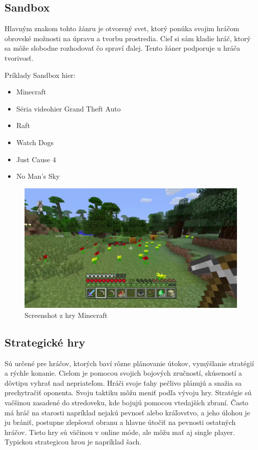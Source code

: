 \documentclass[10pt,twoside,slovak,a4paper]{article}
\begin{document}
\subsection{Sandbox} \label{zanre:sanbox}

Hlavným znakom tohto žánru je otvorený svet, ktorý ponúka svojim hráčom obrovské možnosti na úpravu a tvorbu prostredia. Cieľ si sám kladie hráč, ktorý sa môže slobodne rozhodovať čo spraví ďalej. Tento žáner podporuje u hráča tvorivosť. 

Príklady Sandbox hier:
\begin{itemize}
\item Minecraft
\item Séria videohier Grand Theft Auto
\item Raft
\item Watch Dogs
\item Just Cause 4
\item No Man's Sky
\end{itemize}

\begin{figure}[tbh]
\centering
\includegraphics[scale=0.15]{minecraft.jpg}
\caption{Screenshot z hry Minecraft}
\label{f:minecraft}
\end{figure}

\subsection{Strategické hry} \label{zanre:strategicke}

Sú určené pre hráčov, ktorých baví rôzne plánovanie útokov, vymýšlanie stratégií a rýchle konanie. Cielom je pomocou svojich bojových zručností, skúseností a dôvtipu vyhrať nad nepriateľom. Hráči svoje ťahy pečlivo plánujú a snažia sa prechytračiť oponenta. Svoju taktiku môžu meniť podľa vývoju hry. Stratégie sú vačšinou zasadené do stredoveku, kde bojujú pomocou vtedajších zbraní. Často má hráč na starosti napríklad nejakú pevnosť alebo kráľovstvo, a jeho úlohou je ju brániť, postupne zlepšovať obranu a hlavne útočiť na pevnosti ostatných hráčov. Tieto hry sú väčinou v online móde, ale môžu mať aj single player.  Typickou strategicou hrou je napríklad šach.
\end{document}
